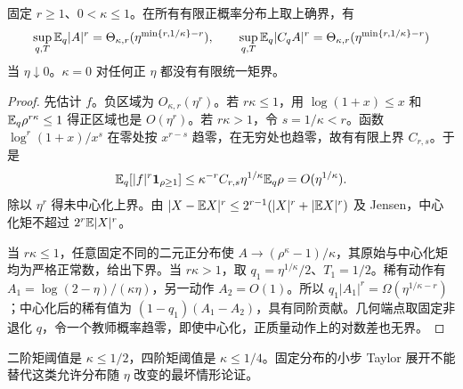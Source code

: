\begin{theorem}[小步矩阈值]
固定 $r\ge1$、$0<\kappa\le1$。在所有有限正概率分布上取上确界，有
\begin{equation}
\sup_{q,T}\mathbb E_q|A|^r
=\Theta_{\kappa,r}(\eta^{\min\{r,1/\kappa\}-r}),\qquad
\sup_{q,T}\mathbb E_q|C_qA|^r
=\Theta_{\kappa,r}(\eta^{\min\{r,1/\kappa\}-r})
\end{equation}
当 $\eta\downarrow0$。$\kappa=0$ 对任何正 $\eta$ 都没有有限统一矩界。
\end{theorem}
\begin{proof}
先估计 $f$。负区域为 $O_{\kappa,r}(\eta^r)$。若 $r\kappa\le1$，用 $\log(1+x)\le x$ 和 $\mathbb E_q\rho^{r\kappa}\le1$ 得正区域也是 $O(\eta^r)$。若 $r\kappa>1$，令 $s=1/\kappa<r$。函数 $\log^r(1+x)/x^s$ 在零处按 $x^{r-s}$ 趋零，在无穷处也趋零，故有有限上界 $C_{r,s}$。于是
\begin{equation}
\mathbb E_q[|f|^r\mathbf1_{\rho\ge1}]
\le\kappa^{-r}C_{r,s}\eta^{1/\kappa}\mathbb E_q\rho
=O(\eta^{1/\kappa}).
\end{equation}
除以 $\eta^r$ 得未中心化上界。由 $|X-\mathbb E X|^r\le2^{r-1}(|X|^r+|\mathbb E X|^r)$ 及 Jensen，中心化矩不超过 $2^r\mathbb E|X|^r$。

当 $r\kappa\le1$，任意固定不同的二元正分布使 $A\to(\rho^\kappa-1)/\kappa$，其原始与中心化矩均为严格正常数，给出下界。当 $r\kappa>1$，取 $q_1=\eta^{1/\kappa}/2$、$T_1=1/2$。稀有动作有 $A_1=\log(2-\eta)/(\kappa\eta)$，另一动作 $A_2=O(1)$。所以 $q_1|A_1|^r=\Omega(\eta^{1/\kappa-r})$；中心化后的稀有值为 $(1-q_1)(A_1-A_2)$，具有同阶贡献。几何端点取固定非退化 $q$，令一个教师概率趋零，即使中心化，正质量动作上的对数差也无界。
\end{proof}

二阶矩阈值是 $\kappa\le1/2$，四阶矩阈值是 $\kappa\le1/4$。固定分布的小步 Taylor 展开不能替代这类允许分布随 $\eta$ 改变的最坏情形论证。

